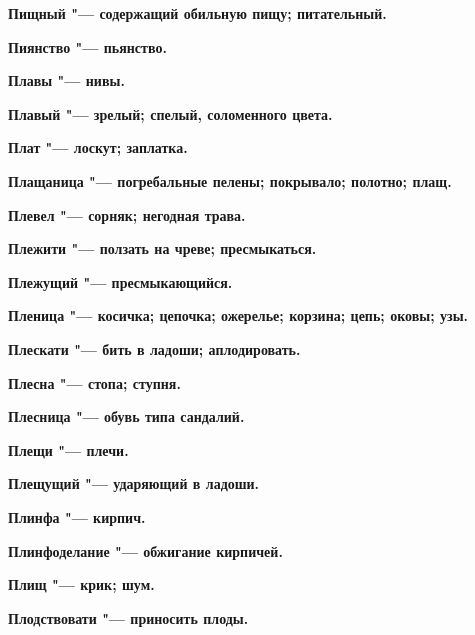 \begin{mymulticols}{2}
\bfseries Пищный\normalfont{} "--- содержащий обильную пищу; питательный. 




\bfseries Пиянство\normalfont{} "--- пьянство. 




\bfseries Плавы\normalfont{} "--- нивы. 




\bfseries Плавый\normalfont{} "--- зрелый; спелый, соломенного цвета. 




\bfseries Плат\normalfont{} "--- лоскут; заплатка. 




\bfseries Плащаница\normalfont{} "--- погребальные пелены; покрывало; полотно; плащ. 




\bfseries Плевел\normalfont{} "--- сорняк; негодная трава. 




\bfseries Плежити\normalfont{} "--- ползать на чреве; пресмыкаться. 




\bfseries Плежущий\normalfont{} "--- пресмыкающийся. 




\bfseries Пленица\normalfont{} "--- косичка; цепочка; ожерелье; корзина; цепь; оковы; узы. 




\bfseries Плескати\normalfont{} "--- бить в ладоши; аплодировать. 




\bfseries Плесна\normalfont{} "--- стопа; ступня. 




\bfseries Плесница\normalfont{} "--- обувь типа сандалий. 




\bfseries Плещи\normalfont{} "--- плечи. 




\bfseries Плещущий\normalfont{} "--- ударяющий в ладоши. 




\bfseries Плинфа\normalfont{} "--- кирпич. 




\bfseries Плинфоделание\normalfont{} "--- обжигание кирпичей. 




\bfseries Плищ\normalfont{} "--- крик; шум. 




\bfseries Плодствовати\normalfont{} "--- приносить плоды. 





\end{mymulticols}
